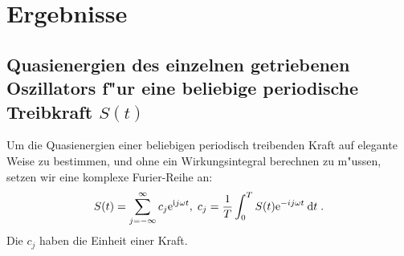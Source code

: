 \chapter{Ergebnisse}


\section{Quasienergien des einzelnen getriebenen Oszillators f"ur eine beliebige periodische Treibkraft $S(t)$}
  Um die Quasienergien einer beliebigen periodisch treibenden Kraft auf elegante Weise zu bestimmen, und ohne ein Wirkungsintegral berechnen zu m"ussen, setzen wir eine komplexe Furier-Reihe an:
  \begin{equation}
    S(t) = \sum_{j=-\infty}^\infty c_j \text e^{\text ij\omega t}, \; c_j = \frac{1}{T} \int_0^T S(t) \text e^{-ij\omega t} \: \text d t \; .
  \end{equation}
  Die $c_j$ haben die Einheit einer Kraft.

